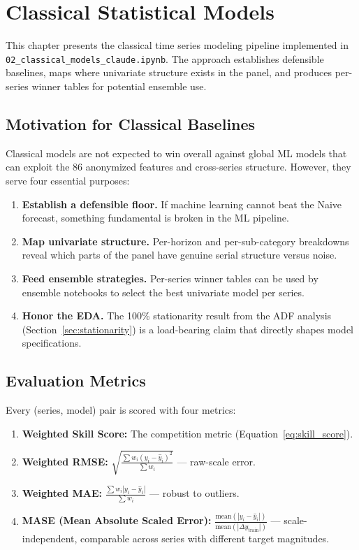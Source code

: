 \chapter{Classical Statistical Models}
\label{ch:classical}

This chapter presents the classical time series modeling pipeline implemented in \texttt{02\_classical\_models\_claude.ipynb}. The approach establishes defensible baselines, maps where univariate structure exists in the panel, and produces per-series winner tables for potential ensemble use.

\section{Motivation for Classical Baselines}

Classical models are not expected to win overall against global ML models that can exploit the 86 anonymized features and cross-series structure. However, they serve four essential purposes:

\begin{enumerate}
    \item \textbf{Establish a defensible floor.} If machine learning cannot beat the Naive forecast, something fundamental is broken in the ML pipeline.
    \item \textbf{Map univariate structure.} Per-horizon and per-sub-category breakdowns reveal which parts of the panel have genuine serial structure versus noise.
    \item \textbf{Feed ensemble strategies.} Per-series winner tables can be used by ensemble notebooks to select the best univariate model per series.
    \item \textbf{Honor the EDA.} The 100\% stationarity result from the ADF analysis (Section~\ref{sec:stationarity}) is a load-bearing claim that directly shapes model specifications.
\end{enumerate}

\section{Evaluation Metrics}

Every (series, model) pair is scored with four metrics:

\begin{enumerate}
    \item \textbf{Weighted Skill Score:} The competition metric (Equation~\ref{eq:skill_score}).
    \item \textbf{Weighted RMSE:} $\sqrt{\frac{\sum w_i (y_i - \hat{y}_i)^2}{\sum w_i}}$ --- raw-scale error.
    \item \textbf{Weighted MAE:} $\frac{\sum w_i |y_i - \hat{y}_i|}{\sum w_i}$ --- robust to outliers.
    \item \textbf{MASE (Mean Absolute Scaled Error):} $\frac{\text{mean}(|y_i - \hat{y}_i|)}{\text{mean}(|\Delta y_{\text{train}}|)}$ --- scale-independent, comparable across series with different target magnitudes.
\end{enumerate}

